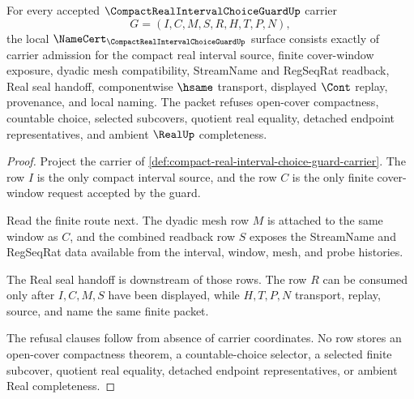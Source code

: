 \begin{theorem}
\label{thm:compact-real-interval-choice-guard-namecert-obligations}
For every accepted $\CompactRealIntervalChoiceGuardUp$ carrier
$$
G=(I,C,M,S,R,H,T,P,N),
$$
the local $\NameCert_{\CompactRealIntervalChoiceGuardUp}$ surface consists exactly of carrier admission for the compact real interval source, finite cover-window exposure, dyadic mesh compatibility, StreamName and RegSeqRat readback, Real seal handoff, componentwise $\hsame$ transport, displayed $\Cont$ replay, provenance, and local naming. The packet refuses open-cover compactness, countable choice, selected subcovers, quotient real equality, detached endpoint representatives, and ambient $\RealUp$ completeness.
\end{theorem}
\begin{proof}
Project the carrier of \autoref{def:compact-real-interval-choice-guard-carrier}. The row $I$ is the only compact interval source, and the row $C$ is the only finite cover-window request accepted by the guard.

Read the finite route next. The dyadic mesh row $M$ is attached to the same window as $C$, and the combined readback row $S$ exposes the StreamName and RegSeqRat data available from the interval, window, mesh, and probe histories.

The Real seal handoff is downstream of those rows. The row $R$ can be consumed only after $I,C,M,S$ have been displayed, while $H,T,P,N$ transport, replay, source, and name the same finite packet.

The refusal clauses follow from absence of carrier coordinates. No row stores an open-cover compactness theorem, a countable-choice selector, a selected finite subcover, quotient real equality, detached endpoint representatives, or ambient Real completeness.
\end{proof}


